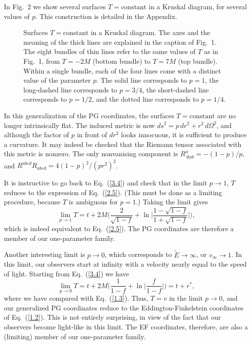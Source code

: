 In Fig.~2 we show several surfaces $T = \mbox{constant}$ in a Kruskal 
diagram, for several values of $p$. This construction is detailed in 
the Appendix. 

\begin{figure}
\vspace*{2.5in}
\caption{Surfaces $T = \mbox{constant}$ in a Kruskal diagram. The axes
and the meaning of the thick lines are explained in the caption of
Fig.~1. The eight bundles of thin lines refer to the same values of
$T$ as in Fig.~1, from $T = -2M$ (bottom bundle) to $T = 7M$ (top
bundle). Within a single bundle, each of the four lines come with a 
distinct value of the parameter $p$. The solid line corresponds to
$p=1$, the long-dashed line corresponds to $p=3/4$, the short-dashed
line corresponds to $p=1/2$, and the dotted line corresponds to
$p=1/4$.}  
\end{figure}

In this generalization of the PG coordinates, the surfaces $T =
\mbox{constant}$ are no longer intrinsically flat. The induced metric 
is now $ds^2 = p\, dr^2 + r^2\, d\Omega^2$, and although the factor of  
$p$ in front of $dr^2$ looks innocuous, it is sufficient to produce a
curvature. It may indeed be checked that the Riemann tensor associated
with this metric is nonzero. The only nonvanising component is 
$R^\phi_{\ \theta\phi\theta} = -(1-p)/p$, and $R^{abcd} R_{abcd} =
4(1-p)^2/(pr^2)^2$.   

It is instructive to go back to Eq.~(\ref{3.4}) and check that in the
limit $p \to 1$, $T$ reduces to the expression of
Eq.~(\ref{2.5}). (This must be done as a limiting procedure, because
$T$ is ambiguous for $p = 1$.) Taking the limit gives
\begin{equation}
\lim_{p \to 1} T = t + 2M \biggl( \frac{2}{\sqrt{1-f}} 
+ \ln \biggl| \frac{1-\sqrt{1-f}}{1+\sqrt{1-f}} \biggr| \biggr), 
\label{3.7}
\end{equation}
which is indeed equivalent to Eq.~(\ref{2.5}). The PG coordinates are
therefore a member of our one-parameter family. 

Another interesting limit is $p \to 0$, which corresponds to
$\tilde{E} \to \infty$, or $v_\infty \to 1$. In this limit, our
observers start at infinity with a velocity nearly equal to the speed
of light. Starting from Eq.~(\ref{3.4}) we have
\begin{equation}
\lim_{p \to 0} T = t + 2M \biggl( \frac{1}{1-f} 
+ \ln \biggl| \frac{f}{1-f} \biggr| \biggr) = t + r^*, 
\label{3.8}     
\end{equation}
where we have compared with Eq.~(\ref{1.3}). Thus, $T = v$ in the
limit $p \to 0$, and our generalized PG coordinates reduce to the
Eddington-Finkelstein coordinates of Eq.~(\ref{1.2}). This is not
entirely surprising, in view of the fact that our observers become
light-like in this limit. The EF coordinates, therefore, are also a
(limiting) member of our one-parameter family.   

